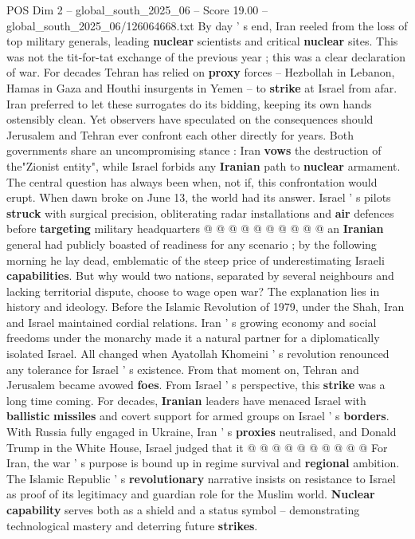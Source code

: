 \begin{textsample}{POS Dim 2 – global\_south\_2025\_06 – Score 19.00 – global\_south\_2025\_06/126064668.txt}  \label{ex:f2_pos_248}
By day ' s end, Iran reeled from the loss of top military generals, leading \textbf{nuclear} scientists and critical \textbf{nuclear} sites.
This was not the tit-for-tat exchange of the previous year ; this was a clear declaration of war.
For decades Tehran has relied on \textbf{proxy} forces -- Hezbollah in Lebanon, Hamas in Gaza and Houthi insurgents in Yemen -- to \textbf{strike} at Israel from afar.
Iran preferred to let these surrogates do its bidding, keeping its own hands ostensibly clean.
Yet observers have speculated on the consequences should Jerusalem and Tehran ever confront each other directly for years.
Both governments share an uncompromising stance : Iran \textbf{vows} the destruction of the"Zionist entity", while Israel forbids any \textbf{Iranian} path to \textbf{nuclear} armament.
The central question has always been when, not if, this confrontation would erupt.
When dawn broke on June 13, the world had its answer.
Israel ' s pilots \textbf{struck} with surgical precision, obliterating radar installations and \textbf{air} defences before \textbf{targeting} military headquarters @ @ @ @ @ @ @ @ @ @ an \textbf{Iranian} general had publicly boasted of readiness for any scenario ; by the following morning he lay dead, emblematic of the steep price of underestimating Israeli \textbf{capabilities}.
But why would two nations, separated by several neighbours and lacking territorial dispute, choose to wage open war?
The explanation lies in history and ideology.
Before the Islamic Revolution of 1979, under the Shah, Iran and Israel maintained cordial relations.
Iran ' s growing economy and social freedoms under the monarchy made it a natural partner for a diplomatically isolated Israel.
All changed when Ayatollah Khomeini ' s revolution renounced any tolerance for Israel ' s existence.
From that moment on, Tehran and Jerusalem became avowed \textbf{foes}.
From Israel ' s perspective, this \textbf{strike} was a long time coming.
For decades, \textbf{Iranian} leaders have menaced Israel with \textbf{ballistic} \textbf{missiles} and covert support for armed groups on Israel ' s \textbf{borders}.
With Russia fully engaged in Ukraine, Iran ' s \textbf{proxies} neutralised, and Donald Trump in the White House, Israel judged that it @ @ @ @ @ @ @ @ @ @ For Iran, the war ' s purpose is bound up in regime survival and \textbf{regional} ambition.
The Islamic Republic ' s \textbf{revolutionary} narrative insists on resistance to Israel as proof of its legitimacy and guardian role for the Muslim world. \textbf{Nuclear} \textbf{capability} serves both as a shield and a status symbol -- demonstrating technological mastery and deterring future \textbf{strikes}.

\end{textsample}
